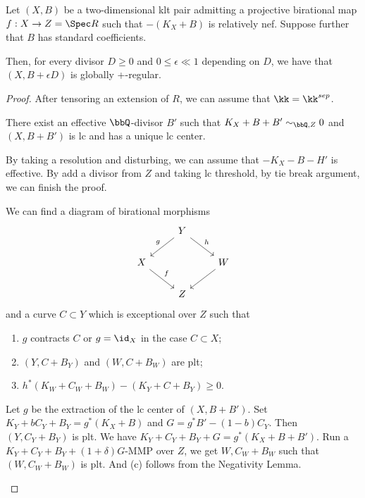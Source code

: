     \begin{theorem}\label{thm:disturb_global_plus_regular_pair}
        Let \((X,B)\) be a two-dimensional klt pair admitting a projective birational map \(f : X \to Z = \Spec R\) such that \(- (K_X + B)\) is relatively nef. 
        Suppose further that \(B\) has standard coefficients. 
        
        Then, for every divisor \(D \geq 0\) and \(0 \leq \epsilon \ll 1\) depending on \(D\), 
        we have that \((X, B + \epsilon D)\) is globally +-regular.
    \end{theorem}
    \begin{proof}
        After tensoring an extension of \(R\), we can assume that \(\kk = \kk^{sep}\).
        \begin{step}
            There exist an effective \(\bbQ\)-divisor \(B'\) such that \(K_X+B+B'\sim_{\bbQ,Z} 0\) and \((X,B+B')\) is lc and has a unique lc center.
        \end{step}
        \begin{subproof}
            By taking a resolution and disturbing, we can assume that \(-K_X - B - H'\) is effective.
            By add a divisor from \(Z\) and taking lc threshold, by tie break argument, we can finish the proof.
        \end{subproof}

        \begin{step}\label{step:birational_morphisms}
            We can find a diagram of birational morphisms
            \[ \begin{tikzcd} 
                & Y \arrow[dl,"g"'] \arrow[dr,"h"] & \\
                X \arrow[dr,"f"] & & W \arrow[dl] \\
                & Z &
            \end{tikzcd} \]
            and a curve \(C \subset Y\) which is exceptional over \(Z\) such that 
            \begin{enumerate}
                \item \(g\) contracts \(C\) or \(g=\id_X\) in the case \(C \subset X\);
                \item \((Y,C+B_Y)\) and \((W,C+B_W)\) are plt;
                \item \(h^*(K_W+C_W+B_W) - (K_Y + C + B_Y) \geq 0\).
            \end{enumerate}
        \end{step}
        \begin{subproof}
            Let \(g\) be the extraction of the lc center of \((X,B+B')\).
            Set \(K_Y + bC_Y + B_Y = g^*(K_X + B)\) and \(G = g^*B' - (1-b) C_Y\).
            Then \((Y,C_Y+B_Y)\) is plt.
            We have \(K_Y + C_Y + B_Y + G = g^*(K_X + B + B')\).
            Run a \(K_Y+C_Y+B_Y+(1+\delta)G\)-MMP over \(Z\), we get \(W, C_W + B_W\) such that \((W,C_W+B_W)\) is plt.
            And (c) follows from the Negativity Lemma.
        \end{subproof}


\end{proof}
